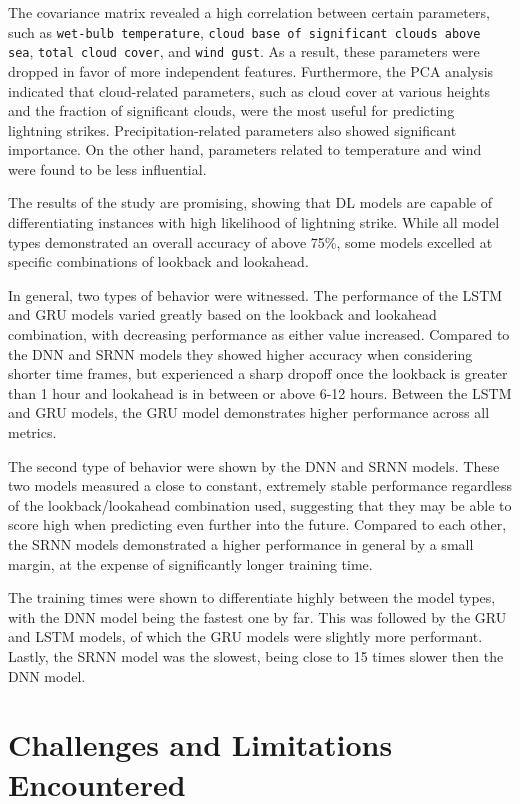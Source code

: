 The covariance matrix revealed a high correlation between certain parameters, such as \texttt{wet-bulb temperature}, \texttt{cloud base of significant clouds above sea}, \texttt{total cloud cover}, and \texttt{wind gust}. As a result, these parameters were dropped in favor of more independent features. Furthermore, the PCA analysis indicated that cloud-related parameters, such as cloud cover at various heights and the fraction of significant clouds, were the most useful for predicting lightning strikes. Precipitation-related parameters also showed significant importance. On the other hand, parameters related to temperature and wind were found to be less influential.


The results of the study are promising, showing that DL models are capable of differentiating instances with high likelihood of lightning strike. While all model types demonstrated an overall accuracy of above 75\%, some models excelled at specific combinations of lookback and lookahead.

In general, two types of behavior were witnessed. The performance of the LSTM and GRU models varied greatly based on the lookback and lookahead combination, with decreasing performance as either value increased. Compared to the DNN and SRNN models they showed higher accuracy when considering shorter time frames, but experienced a sharp dropoff once the lookback is greater than 1 hour and lookahead is in between or above 6-12 hours. Between the LSTM and GRU models, the GRU model demonstrates higher performance across all metrics.

The second type of behavior were shown by the DNN and SRNN models. These two models measured a close to constant, extremely stable performance regardless of the lookback/lookahead combination used, suggesting that they may be able to score high when predicting even further into the future. Compared to each other, the SRNN models demonstrated a higher performance in general by a small margin, at the expense of significantly longer training time.

The training times were shown to differentiate highly between the model types, with the DNN model being the fastest one by far. This was followed by the GRU and LSTM models, of which the GRU models were slightly more performant. Lastly, the SRNN model was the slowest, being close to 15 times slower then the DNN model.

\section{Challenges and Limitations Encountered}

